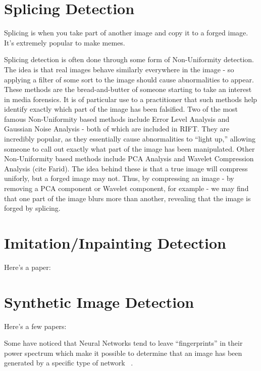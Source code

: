 \documentclass[compsoc]{IEEEtran}
\begin{document}
\section{Splicing Detection}
Splicing is when you take part of another image and copy it to a forged image.
It's extremely popular to make memes.

Splicing detection is often done through some form of Non-Uniformity detection. The idea is that real images behave similarly everywhere in the image - so applying a filter of some sort to the image should cause abnormalities to appear.
These methods are the bread-and-butter of someone starting to take an interest in media forensics.
It is of particular use to a practitioner that such methods help identify exactly which part of the image has been falsified.
Two of the most famous Non-Uniformity based methods include Error Level Analysis and Gaussian Noise Analysis - both of which are included in RIFT. They are incredibly popular, as they essentially cause abnormalities to ``light up,'' allowing someone to call out exactly what part of the image has been manipulated.
Other Non-Uniformity based methods include PCA Analysis and Wavelet Compression Analysis (cite Farid). The idea behind these is that a true image will compress uniforly, but a forged image may not. Thus, by compressing an image - by removing a PCA component or Wavelet component, for example - we may find that one part of the image blurs more than another, revealing that the image is forged by splicing. 

\section{Imitation/Inpainting Detection}
Here's a paper: ~\cite{farid2022lighting}

\section{Synthetic Image Detection}

Here's a few papers: ~\cite{yu2019attributing}
~\cite{zhang2019detecting}
~\cite{wang2020cnngenerated}
~\cite{Verdoliva_2020}
~\cite{frank2020leveraging}
~\cite{chai2020makes}
~\cite{gragnaniello2021gan}
~\cite{corvi2022detection}
~\cite{thing2023deepfake}
~\cite{corvi2023intriguing}

Some have noticed that Neural Networks tend to leave ``fingerprints'' in their power spectrum which make it possible to determine that an image has been generated by a specific type of network ~\cite{marra2018gans}.
\end{document}
